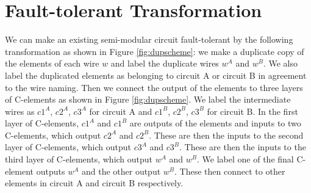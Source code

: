 \documentclass[12pt]{report}
\begin{document}
\section{Fault-tolerant Transformation}

We can make an existing semi-modular circuit fault-tolerant by the following transformation as shown in Figure \ref{fig:dupscheme}: we make a duplicate copy of the elements of each wire $w$ and label the duplicate wires $w^A$ and $w^B$.  We also label the duplicated elements as belonging to circuit A or circuit B in agreement to the wire naming.  Then we connect the output of the elements to three layers of C-elements as shown in Figure \ref{fig:dupscheme}.  We label the intermediate wires as $c1^A$, $c2^A$, $c3^A$ for circuit A and $c1^B$, $c2^B$, $c3^B$ for circuit B.  In the first layer of C-elements, $c1^A$ and $c1^B$ are outputs of the elements and inputs to two C-elements, which output $c2^A$ and $c2^B$.  These are then the inputs to the second layer of C-elements, which output $c3^A$ and $c3^B$.  These are then the inputs to the third layer of C-elements, which output $w^A$ and $w^B$.  We label one of the final C-element outputs $w^A$ and the other output $w^B$.  These then connect to other elements in circuit A and circuit B respectively.  \\
\end{document}
